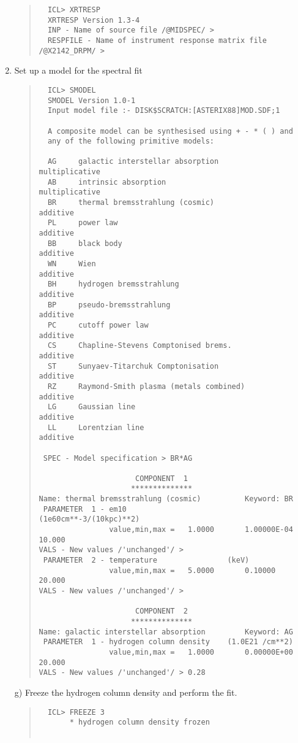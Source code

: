 \documentclass{book}
\renewcommand{\_}{{\tt\char'137}}     %
\begin{document}
\begin{enumerate}
\begin{quote}\begin{verbatim}
  ICL> XRTRESP
  XRTRESP Version 1.3-4
  INP - Name of source file /@MIDSPEC/ >
  RESPFILE - Name of instrument response matrix file /@X2142_DRPM/ >
  \end{verbatim}\end{quote}
\item Set up a model for the spectral fit

\begin{quote}\begin{verbatim}
  ICL> SMODEL
  SMODEL Version 1.0-1
  Input model file :- DISK$SCRATCH:[ASTERIX88]MOD.SDF;1

  A composite model can be synthesised using + - * ( ) and
  any of the following primitive models:

  AG     galactic interstellar absorption             multiplicative
  AB     intrinsic absorption                         multiplicative
  BR     thermal bremsstrahlung (cosmic)              additive
  PL     power law                                    additive
  BB     black body                                   additive
  WN     Wien                                         additive
  BH     hydrogen bremsstrahlung                      additive
  BP     pseudo-bremsstrahlung                        additive
  PC     cutoff power law                             additive
  CS     Chapline-Stevens Comptonised brems.          additive
  ST     Sunyaev-Titarchuk Comptonisation             additive
  RZ     Raymond-Smith plasma (metals combined)       additive
  LG     Gaussian line                                additive
  LL     Lorentzian line                              additive

 SPEC - Model specification > BR*AG

                      COMPONENT  1
                     **************
Name: thermal bremsstrahlung (cosmic)          Keyword: BR
 PARAMETER  1 - em10                       (1e60cm**-3/(10kpc)**2)
                value,min,max =   1.0000       1.00000E-04    10.000
VALS - New values /'unchanged'/ >
 PARAMETER  2 - temperature                (keV)
                value,min,max =   5.0000       0.10000        20.000
VALS - New values /'unchanged'/ >

                      COMPONENT  2
                     **************
Name: galactic interstellar absorption         Keyword: AG
 PARAMETER  1 - hydrogen column density    (1.0E21 /cm**2)
                value,min,max =   1.0000       0.00000E+00    20.000
VALS - New values /'unchanged'/ > 0.28
  \end{verbatim}\end{quote}
g) Freeze the hydrogen column density and perform the fit.
\begin{quote}\begin{verbatim}
  ICL> FREEZE 3
       * hydrogen column density frozen


\end{verbatim}
\end{quote}
\end{enumerate}
\end{document}
